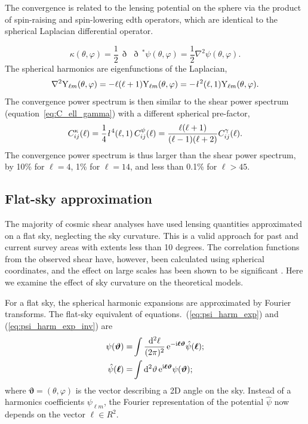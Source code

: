 \documentclass[fleqn,usenatbib]{mnras} %
\newcommand{\ellbar}{\hbox{\it \l}\,}
\newcommand{\edth}{\,\eth\,}
\renewcommand{\vec}{\bm}
\begin{document}
The convergence is related to the lensing potential on the sphere via the
product of spin-raising and spin-lowering edth operators, which are identical
to the spherical Laplacian differential operator.

%
\begin{equation}
  \kappa(\theta, \varphi) = \frac 1 2 \edth \edth^\ast \psi(\theta, \varphi) = \frac 1 2 \nabla^2 \psi(\theta, \varphi).
  \label{eq:kappa_psi_spher}
\end{equation}
%
The spherical harmonics are eigenfunctions of the Laplacian,
%
\begin{equation}
  \nabla^2 {\rm Y}_{\ell m}(\theta, \varphi) = - \ell (\ell + 1) {\rm Y}_{\ell m}(\theta, \varphi)
    = - \ellbar^2(\ell, 1) {\rm Y}_{\ell m}(\theta, \varphi).
  \label{eq:nabla_Ylm}
\end{equation}
%
The convergence power spectrum is then similar to the shear power spectrum
(equation~\ref{eq:C_ell_gamma}) with a different spherical pre-factor, \citep{jk12}
%
\begin{equation}
  C^\kappa_{ij}(\ell) = \frac 1 4 \ellbar^4(\ell, 1) \, C^\psi_{ij}(\ell)
    = \frac{\ell (\ell+1)}{(\ell-1)(\ell+2)} C^\gamma_{ij}(\ell) .
  \label{eq:C_ell_kappa_full}
\end{equation}
%
The convergence power spectrum is thus larger than the shear power spectrum, by
10\% for $\ell=4$, 1\% for $\ell = 14$, and less than 0.1\% for $\ell>45$.


\subsection{Flat-sky approximation}
The majority of cosmic shear analyses have used lensing quantities approximated on a flat sky,
neglecting the sky curvature. This is a valid approach for past and current
survey areas with extents less than 10 degrees. The correlation
functions from the observed shear have, however, been calculated using spherical
coordinates, and the effect on large scales has been shown to be significant \citep{FSHK08}.
Here we examine the effect of sky curvature on the theoretical models.

For a flat sky, the spherical harmonic expansions are approximated by Fourier
transforms. The flat-sky equivalent of equations.~(\ref{eq:psi_harm_exp}) and
(\ref{eq:psi_harm_exp_inv}) are
%
\begin{align}
  \psi(\vec \vartheta) = & \int \frac{{\rm d}^2 \ell}{(2\pi)^2} \, {\rm e}^{-{\rm i} \vec \ell \vec \vartheta} \hat \psi(\vec \ell);
  \label{eq:psi_fourier}
  \\
  \hat \psi(\vec \ell) = & \int {\rm d}^2 \vartheta \, {\rm e}^{{\rm i} \vec \ell \vec \vartheta} \psi(\vec \vartheta);
  \label{eq:psi_fourier_inv}
\end{align}
%
where $\vec \vartheta = (\theta, \varphi)$ is the vector describing a 2D angle on the sky.
Instead of a harmonics coefficients $\psi_{\ell m}$, the Fourier representation of the potential
$\hat \psi$ now depends on the vector $\vec \ell \in R^2$.
\end{document}

